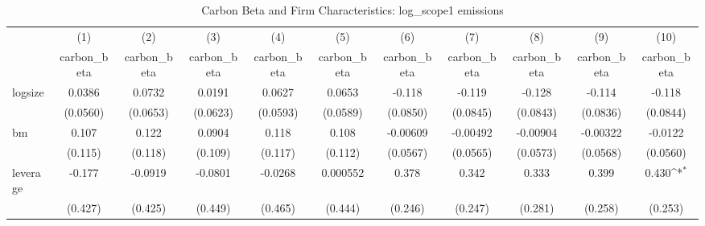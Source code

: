 \begin{table}[htbp]\centering
\def\sym#1{\ifmmode^{#1}\else\(^{#1}\)\fi}
\caption{Carbon Beta and Firm Characteristics: log\_scope1 emissions}
\begin{tabular}{l*{10}{c}}
\hline\hline
                    &\multicolumn{1}{c}{(1)}&\multicolumn{1}{c}{(2)}&\multicolumn{1}{c}{(3)}&\multicolumn{1}{c}{(4)}&\multicolumn{1}{c}{(5)}&\multicolumn{1}{c}{(6)}&\multicolumn{1}{c}{(7)}&\multicolumn{1}{c}{(8)}&\multicolumn{1}{c}{(9)}&\multicolumn{1}{c}{(10)}\\
                    &\multicolumn{1}{c}{carbon\_beta}&\multicolumn{1}{c}{carbon\_beta}&\multicolumn{1}{c}{carbon\_beta}&\multicolumn{1}{c}{carbon\_beta}&\multicolumn{1}{c}{carbon\_beta}&\multicolumn{1}{c}{carbon\_beta}&\multicolumn{1}{c}{carbon\_beta}&\multicolumn{1}{c}{carbon\_beta}&\multicolumn{1}{c}{carbon\_beta}&\multicolumn{1}{c}{carbon\_beta}\\
\hline
logsize             &      0.0386         &      0.0732         &      0.0191         &      0.0627         &      0.0653         &      -0.118         &      -0.119         &      -0.128         &      -0.114         &      -0.118         \\
                    &    (0.0560)         &    (0.0653)         &    (0.0623)         &    (0.0593)         &    (0.0589)         &    (0.0850)         &    (0.0845)         &    (0.0843)         &    (0.0836)         &    (0.0844)         \\
[1em]
bm                  &       0.107         &       0.122         &      0.0904         &       0.118         &       0.108         &    -0.00609         &    -0.00492         &    -0.00904         &    -0.00322         &     -0.0122         \\
                    &     (0.115)         &     (0.118)         &     (0.109)         &     (0.117)         &     (0.112)         &    (0.0567)         &    (0.0565)         &    (0.0573)         &    (0.0568)         &    (0.0560)         \\
[1em]
leverage            &      -0.177         &     -0.0919         &     -0.0801         &     -0.0268         &    0.000552         &       0.378         &       0.342         &       0.333         &       0.399         &       0.430\sym{*}  \\
                    &     (0.427)         &     (0.425)         &     (0.449)         &     (0.465)         &     (0.444)         &     (0.246)         &     (0.247)         &     (0.281)         &     (0.258)         &     (0.253)         \\

\end{tabular}
\end{table}
